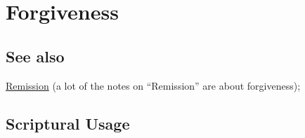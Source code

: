 \section{Forgiveness}
	\label{FORGIVENESS}
	
\subsection{See also}

	\hyperref[REMISSION]{Remission} (a lot of the notes on ``Remission'' are about forgiveness); 





\subsection{Scriptural Usage} %
	\label{FORGIVENESS-SCRIPTURES}

	
	
